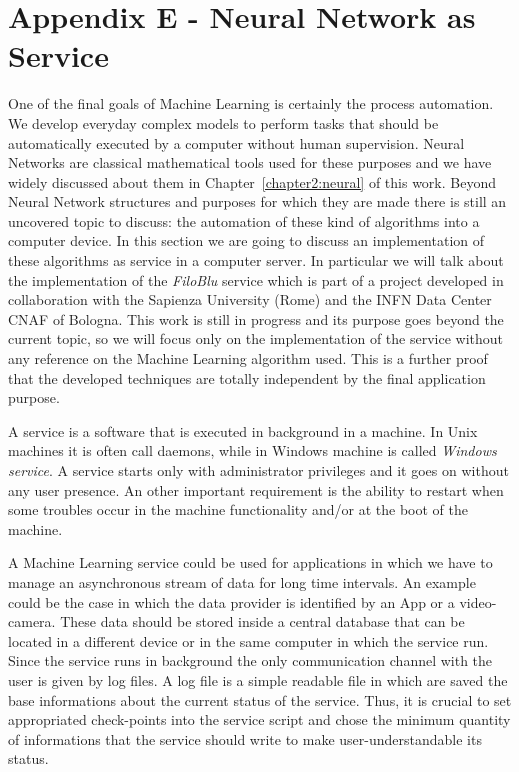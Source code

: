 \documentclass{standalone}
\begin{document}
\chapter*{Appendix E - Neural Network as Service}

One of the final goals of Machine Learning is certainly the process automation.
We develop everyday complex models to perform tasks that should be automatically executed by a computer without human supervision.
Neural Networks are classical mathematical tools used for these purposes and we have widely discussed about them in Chapter~\ref{chapter2:neural} of this work.
Beyond Neural Network structures and purposes for which they are made there is still an uncovered topic to discuss: the automation of these kind of algorithms into a computer device.
In this section we are going to discuss an implementation of these algorithms as service in a computer server.
In particular we will talk about the implementation of the \emph{FiloBlu} service which is part of a project developed in collaboration with the Sapienza University (Rome) and the INFN Data Center CNAF of Bologna.
This work is still in progress and its purpose goes beyond the current topic, so we will focus only on the implementation of the service without any reference on the Machine Learning algorithm used.
This is a further proof that the developed techniques are totally independent by the final application purpose.

A service is a software that is executed in background in a machine.
In Unix machines it is often call \textsf{daemon}s, while in Windows machine is called \emph{Windows service}.
A service starts only with administrator privileges and it goes on without any user presence.
An other important requirement is the ability to restart when some troubles occur in the machine functionality and/or at the boot of the machine.

A Machine Learning service could be used for applications in which we have to manage an asynchronous stream of data for long time intervals.
An example could be the case in which the data provider is identified by an App or a video-camera.
These data should be stored inside a central database that can be located in a different device or in the same computer in which the service run.
Since the service runs in background the only communication channel with the user is given by log files.
A log file is a simple readable file in which are saved the base informations about the current status of the service.
Thus, it is crucial to set appropriated check-points into the service script and chose the minimum quantity of informations that the service should write to make user-understandable its status.
\end{document}
